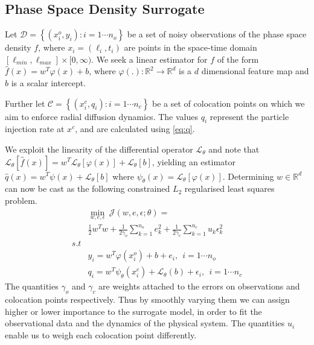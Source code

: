 \subsection{Phase Space Density Surrogate}

Let $\mathcal{D}= \left\{(x^{o}_{i}, y_{i}): i = 1 \cdots n_{o} \right\}$ be a set of noisy 
observations of the phase space density $f$, where $x_{i} = (\ell_{i}, t_{i})$ are points in the 
space-time domain $[\ell_{min}, \ell_{max}] \times [0, \infty)$. We seek a linear estimator for $f$ 
of the form $\hat{f}(x) = w^{T}\varphi(x) + b$, where 
$\varphi(.): \mathbb{R}^{2} \rightarrow \mathbb{R}^{d}$ is a $d$ dimensional feature map and $b$ 
is a scalar intercept.

Further let $\mathcal{C} = \left\{ (x^{c}_{i}, q_{i}): i = 1 \cdots n_{c} \right\}$ be a set of 
colocation points on which we aim to enforce radial diffusion dynamics. The values $q_{i}$ 
represent the particle injection rate at $x^c$, and are calculated using \cref{eq:q}.

We exploit the linearity of the differential operator $\mathcal{L}_{\theta}$ and note that 
$\mathcal{L}_{\theta} [\hat{f}(x)] = w^{T} \mathcal{L}_{\theta}[\varphi(x)] + \mathcal{L}_{\theta}[b]$, 
yielding an estimator 
$\hat{q}(x) = w^{T}\psi(x) + \mathcal{L}_{\theta}[b]$ where $\psi_{\theta}(x) = \mathcal{L}_{\theta}[\varphi(x)]$. 
Determining $w \in \mathbb{R}^d$ can now be cast as the following constrained $L_2$ regularised 
least squares problem.
%
\begin{equation}\label{eq:surrogate}
   \begin{aligned}
    & \min_{w,e,\epsilon} \ \mathcal{J}(w,e,\epsilon;\theta) = \\
    & \frac{1}{2} w^{T}w + \frac{1}{2\gamma_{o}} \sum_{k = 1}^{n_{o}}{e^{2}_{k}} + 
      \frac{1}{2\gamma_{c}} \sum_{k = 1}^{n_{c}}{u_{k} \epsilon^{2}_{k}} \\
    s.t & \\
    & y_{i}  = w^{T}\varphi(x^{o}_{i}) + b + e_{i}, \ \ i = 1 \cdots n_{o} \\
    & q_{i} = w^{T}\psi_{\theta}(x^{c}_{i}) + \mathcal{L}_{\theta}(b) + \epsilon_{i}, \ \ i = 1 \cdots n_{c}
   \end{aligned}
\end{equation}
%
The quantities $\gamma_{o}$ and $\gamma_{c}$ are weights attached to the errors on observations and 
colocation points respectively. Thus by smoothly varying them we can assign higher or lower 
importance to the surrogate model, in order to fit the observational data and the dynamics of the 
physical system. The quantities $u_i$ enable us to weigh each colocation point differently. 

